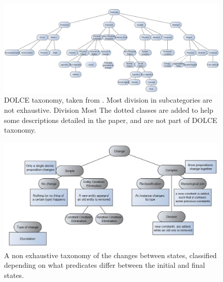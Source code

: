 \documentclass[sw]{iosart2x}
\newcommand{\DOLCE}{\textsc{DOLCE}\xspace} %
\begin{document}
\begin{figure}
  \centering
  \includegraphics[width=\textwidth]{DOLCE-taxa.JPG}
  \caption{\label{fig:DOLCE-taxa} \DOLCE taxonomy, taken from \cite{borgoDOLCEDescriptiveOntology2022}. Most division in subcategories are not exhaustive. Division Most The dotted classes are added to help some descriptions detailed in the paper, and are not part of \DOLCE taxonomy.}
\end{figure}
\begin{figure}
  \centering
  \includegraphics[width=\textwidth]{onto-func-logic.JPG}
  \caption{\label{fig:onto-func-logic} A non exhaustive taxonomy of the changes between states, classified depending on what predicates differ between the initial and final states.}
\end{figure}
\end{document}
